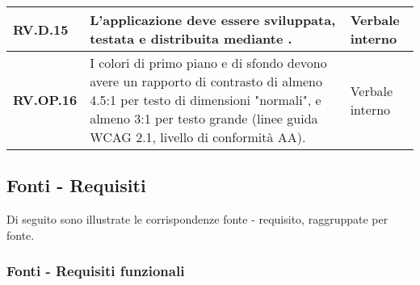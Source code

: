 \begin{adjustwidth}{-0.5cm}{-0.5cm}
\begin{longtable}{|P{3cm}|P{6,5cm}|>{\arraybackslash}P{4cm}|}
    \hline
    \textbf{RV.D.15} & L'applicazione deve essere sviluppata, testata e distribuita mediante . & Verbale interno \\
    \hline
    \textbf{RV.OP.16} & I colori di primo piano e di sfondo devono avere un rapporto di contrasto di almeno 4.5:1 per testo di dimensioni "normali", e almeno 3:1 per testo grande (linee guida WCAG 2.1, livello di conformità AA). & Verbale interno \\
  \end{longtable}
\end{adjustwidth}
\egroup

\subsection{Fonti - Requisiti}
Di seguito sono illustrate le corrispondenze fonte - requisito, raggruppate per fonte.

\subsubsection{Fonti - Requisiti funzionali}

